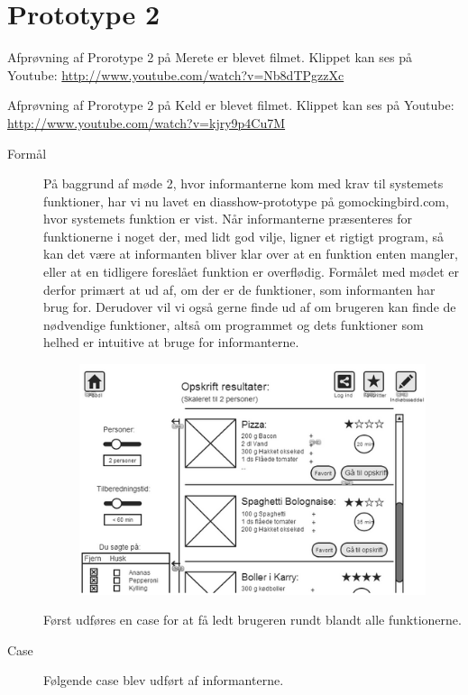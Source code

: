 \section{Prototype 2}
Afprøvning af Prorotype 2 på Merete er blevet filmet. Klippet kan ses på Youtube: \url{http://www.youtube.com/watch?v=Nb8dTPgzzXc}

Afprøvning af Prorotype 2 på Keld er blevet filmet. Klippet kan ses på Youtube: \url{http://www.youtube.com/watch?v=kjry9p4Cu7M}

\begin{description}
\item[Formål] På baggrund af møde 2, hvor informanterne kom med krav til systemets funktioner, har vi nu lavet en diasshow-prototype på gomockingbird.com, hvor systemets funktion er vist. Når informanterne præsenteres for funktionerne i noget der, med lidt god vilje, ligner et rigtigt program, så kan det være at informanten bliver klar over at en funktion enten mangler, eller at en tidligere foreslået funktion er overflødig. Formålet med mødet er derfor primært at ud af, om der er de funktioner, som informanten har brug for. Derudover vil vi også gerne finde ud af om brugeren kan finde de nødvendige funktioner, altså om programmet og dets funktioner som helhed er intuitive at bruge for informanterne.

\begin{figure}[H]
\centering
\includegraphics[scale=0.7]{billeder/prototyper/prototype2.png}
\label{fig:prototype2}
\end{figure}

Først udføres en case for at få ledt brugeren rundt blandt alle funktionerne.

\item[Case] Følgende case blev udført af informanterne.


\end{description}
